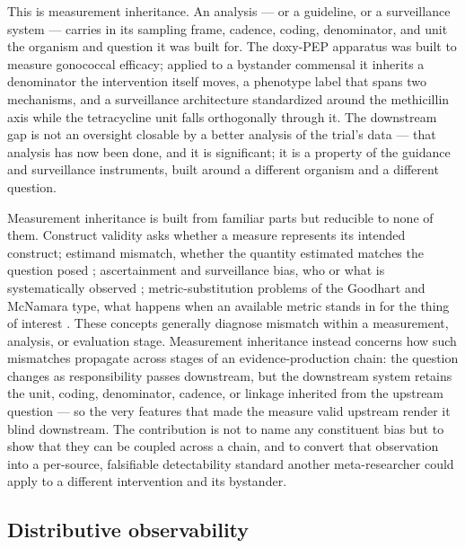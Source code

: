 \documentclass[10pt,letterpaper]{article}
\begin{document}
This is measurement inheritance. An analysis --- or a guideline,
or a surveillance system --- carries in its sampling frame, cadence,
coding, denominator, and unit the organism and question it was built
for. The doxy-PEP apparatus was built to measure gonococcal efficacy;
applied to a bystander commensal it inherits a denominator the
intervention itself moves, a phenotype label that spans two mechanisms,
and a surveillance architecture standardized around the methicillin axis
while the tetracycline unit falls orthogonally through it. The
downstream gap is not an oversight closable by a better analysis of the
trial's data --- that analysis has now been done, and it is significant;
it is a property of the guidance and surveillance instruments, built
around a different organism and a different question.

Measurement inheritance is built from familiar parts but reducible to
none of them. Construct validity asks whether a measure
represents its intended construct; estimand mismatch, whether the
quantity estimated matches the question posed \cite{montoya2025estimand}; ascertainment and
surveillance bias, who or what is systematically observed \cite{tancredi2024surveillance};
metric-substitution problems of the Goodhart and McNamara type,
what happens when an available metric stands in for the thing of interest \cite{treem2023visibility}. These concepts generally diagnose mismatch within a measurement, analysis, or evaluation stage. Measurement inheritance instead concerns how such mismatches propagate across stages of an evidence-production chain: the question changes as responsibility passes
downstream, but the downstream system retains the unit, coding,
denominator, cadence, or linkage inherited from the upstream question
--- so the very features that made the measure valid upstream render it
blind downstream. The contribution is not to name any constituent bias
but to show that they can be coupled across a chain, and to
convert that observation into a per-source, falsifiable detectability
standard another meta-researcher could apply to a different intervention
and its bystander.

\subsection*{Distributive observability}
\end{document}
